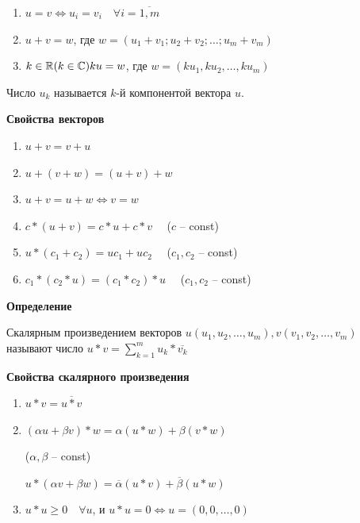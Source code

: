 \documentclass{article}
\newcommand{\parspace}{\vspace{10pt}}
\theoremstyle{break}
\begin{document}
\begin{enumerate}
    \item $u = v \Leftrightarrow u_i = v_i \quad \forall i = \overline{1, m}$
    \item $u + v = w$, где $w = (u_1 + v_1; u_2 + v_2; \dots; u_m + v_m)$
    \item $k \in \mathbb{R} (k \in \mathbb{C}) \\
    ku = w$, где $w = (k u_1, k u_2, \dots, k u_m)$
\end{enumerate}

Число $u_k$ называется $k$-й компонентой вектора $u$.

\parspace

\textbf{Свойства векторов}

\begin{enumerate}
    \item $u + v = v + u$
    \item $u + (v + w) = (u + v) + w$
    \item $u + v = u + w \Leftrightarrow v = w$
    \item $c * (u + v) = c * u + c * v \quad$ ($c$ -- const)
    \item $u * (c_1 + c_2) = u c_1 + u c_2 \quad$ ($c_1, c_2$ -- const)
    \item $c_1 * (c_2 * u) = (c_1 * c_2) * u \quad$ ($c_1, c_2$ -- const)
\end{enumerate}

\parspace

\textbf{Определение}

Скалярным произведением векторов $u(u_1, u_2, \dots, u_m), v(v_1, v_2, \dots, v_m)$
называют число $u * v = \displaystyle\sum_{k = 1}^{m} u_k * \overline{v_k}$

\parspace

\textbf{Свойства скалярного произведения}
\begin{enumerate}
    \item $u * v = \overline{u * v}$
    \item $(\alpha u + \beta v) * w = \alpha (u * w) + \beta (v * w)$

    ($\alpha, \beta$ -- const)

    $u * (\alpha v + \beta w) = \overline{\alpha} (u * v) + \overline{\beta} (u * w)$

    \item $u * u \ge 0 \quad \forall u$, и $u * u = 0 \Leftrightarrow u = (0,0,\dots,0)$
\end{enumerate}
\end{document}
